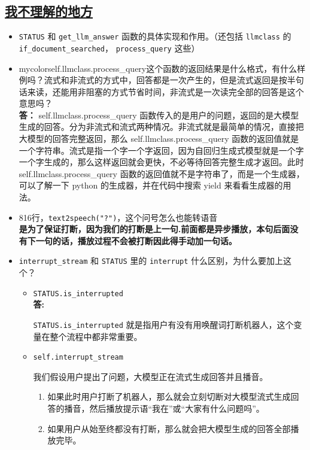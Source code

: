 \documentclass[]{article}
\begin{document}
	\subsection{\underline{我不理解的地方}}
\begin{itemize}
	\item \texttt{STATUS} 和 \texttt{get\_llm\_answer} 函数的具体实现和作用。（还包括 \texttt{llmclass} 的 \texttt{if\_document\_searched}， \texttt{process\_query} 这些）
	\item {mycolor}{self.llmclass.process\_query这个函数的返回结果是什么格式，有什么样例吗？流式和非流式的方式中，回答都是一次产生的，但是流式返回是按半句话来读，还能用非阻塞的方式节省时间，非流式是一次读完全部的回答是这个意思吗？}\\
	\textbf{答：} self.llmclass.process\_query 函数传入的是用户的问题，返回的是大模型生成的回答。分为非流式和流式两种情况。非流式就是最简单的情况，直接把大模型的回答完整返回，那么 self.llmclass.process\_query 函数的返回值就是一个字符串。流式是指一个字一个字返回，因为自回归生成式模型就是一个字一个字生成的，那么这样返回就会更快，不必等待回答完整生成才返回。此时 self.llmclass.process\_query 函数的返回值就不是字符串了，而是一个生成器，可以了解一下 python 的生成器，并在代码中搜索 yield 来看看生成器的用法。
	\item 816行，\texttt{text2speech("?")}，这个问号怎么也能转语音\\
	\textbf{是为了保证打断，因为我们的打断是上一句.前面都是异步播放，本句后面没有下一句的话，播放过程不会被打断因此得手动加一句话。}
	\item \texttt{interrupt\_stream} 和 \texttt{STATUS} 里的 \texttt{interrupt} 什么区别，为什么要加上这个？
	\begin{itemize}
		\item \texttt{STATUS.is\_interrupted}\\
		\textbf{答:}
		
		\texttt{STATUS.is\_interrupted} 就是指用户有没有用唤醒词打断机器人，这个变量在整个流程中都非常重要。
		
		\item \texttt{self.interrupt\_stream}
		
		我们假设用户提出了问题，大模型正在流式生成回答并且播音。
		
		\begin{enumerate}
			\item 如果此时用户打断了机器人，那么就会立刻切断对大模型流式生成回答的播音，然后播放提示语“我在”或“大家有什么问题吗”。
			\item 如果用户从始至终都没有打断，那么就会把大模型生成的回答全部播放完毕。
		\end{enumerate}
		

\end{itemize}
\end{itemize}
\end{document}
